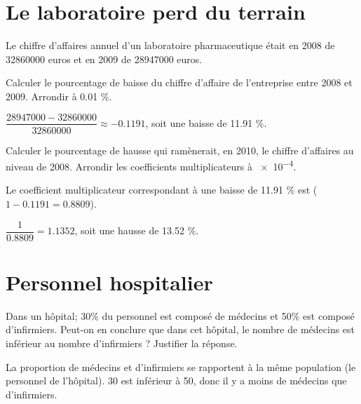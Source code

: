 \documentclass[a4paper,11pt]{exam}
\begin{document}
\section{Le laboratoire perd du terrain}

Le chiffre d'affaires annuel d'un laboratoire pharmaceutique était en 2008 de \num{32860000} euros et en 2009 de \num{28947000} euros.
\begin{questions}
	\question Calculer le pourcentage de baisse du chiffre d'affaire de l'entreprise entre 2008 et 2009. Arrondir à \num{0.01} \%.
	\begin{solution}
		$\dfrac{\num{28947000} - \num{32860000}}{\num{32860000}} \approx \num{-0.1191}$, soit une baisse de \num{11.91} \%.
	\end{solution}
	
	\question Calculer le pourcentage de hausse qui ramènerait, en 2010, le chiffre d'affaires au niveau de 2008. Arrondir les coefficients multiplicateurs à \num{e-4}.
	\begin{solution}
		Le coefficient multiplicateur correspondant à une baisse de \num{11.91} \% est ($1-\num{0.1191} = \num{0.8809}$).
		
		$\dfrac{1}{\num{0.8809}} = \num{1.1352}$, soit une hausse de \num{13.52} \%.
	\end{solution}
\end{questions}


\section{Personnel hospitalier}

Dans un hôpital; 30\% du personnel est composé de médecins et 50\% est composé d'infirmiers. Peut-on en conclure que dans cet hôpital, le nombre de médecins est inférieur au nombre d'infirmiers ? Justifier la réponse.

\begin{solution}
	La proportion de médecins et d'infirmiers se rapportent à la même population (le personnel de l'hôpital). 30 est inférieur à 50, donc il y a moins de médecins que d'infirmiers.
\end{solution}

	\label{LastPage}
	
\end{document}
